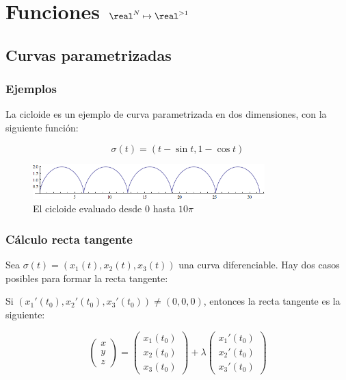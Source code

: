 \documentclass[nochap]{apuntes}
\begin{document}
\section{Funciones $\real^N \mapsto \real^{>1}$}

\subsection{Curvas parametrizadas}
\subsubsection{Ejemplos}

La cicloide es un ejemplo de curva parametrizada en dos dimensiones, con la siguiente función:

\[ \sigma(t) = (t - \sin t, 1 - \cos t) \]

\begin{figure}[hbtp]    
	\begin{center} 
		\includegraphics[width=0.8\textwidth]{img/Cicloide.png}  
		\caption{El cicloide evaluado desde 0 hasta $10 \pi$} 
	\end{center}  
\end{figure}

\subsubsection{Cálculo recta tangente}
Sea $\sigma (t) = (x_1 (t),x_2(t), x_3(t))$ una curva diferenciable. Hay dos casos posibles para formar la recta tangente:

Si $ (x_1' (t_0),x_2'(t_0), x_3'(t_0))≠ (0,0,0)$, entonces la recta tangente es la siguiente:

\[ \begin{pmatrix} x \\ y \\ z \end{pmatrix} = \begin{pmatrix}{x_1(t_0)} \\ {x_2(t_0)} \\ {x_3(t_0)}\end{pmatrix} + \lambda \begin{pmatrix}{x_1'(t_0)} \\ {x_2'(t_0)} \\ {x_3'(t_0)}\end{pmatrix} \]
\end{document}
